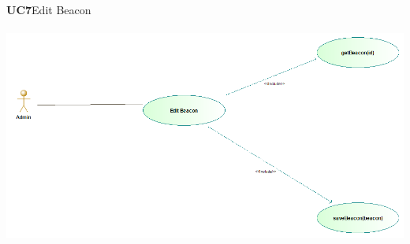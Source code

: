 \documentclass[11pt]{article}
\begin{document}
\\
\textbf{UC7}Edit Beacon\\\\
\includegraphics[scale=0.5]{./DiagramsTshepo/editBeacon.png}\\\\
\end{document}
